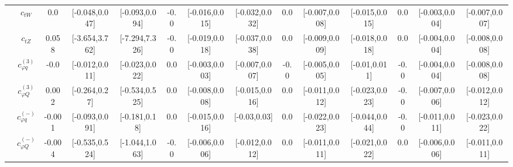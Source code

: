 \documentclass{article}
\begin{document}
\begin{table}[H]
\begin{tabular}{|c|c|c|c|c|c|c|c|c|c|c|c|c|c|}
 & $c_{tW}$ & 0.0                             & [-0.048,0.047]                                 & [-0.093,0.094] & -0.0                             & [-0.016,0.015]                                 & [-0.032,0.032] & 0.0                             & [-0.007,0.008]                                 & [-0.015,0.015] & 0.0                             & [-0.003,0.004]                                 & [-0.007,0.007] \\ \cline{2-14}
 & $c_{tZ}$ & 0.058                             & [-3.654,3.762]                                 & [-7.294,7.326] & -0.0                             & [-0.019,0.018]                                 & [-0.037,0.038] & 0.0                             & [-0.009,0.009]                                 & [-0.018,0.018] & 0.0                             & [-0.004,0.004]                                 & [-0.008,0.008] \\ \cline{2-14}
 & $c_{\varphi q}^{(3)}$ & -0.0                             & [-0.012,0.011]                                 & [-0.023,0.022] & 0.0                             & [-0.003,0.003]                                 & [-0.007,0.007] & -0.0                             & [-0.005,0.005]                                 & [-0.01,0.011] & -0.0                             & [-0.004,0.004]                                 & [-0.008,0.008] \\ \cline{2-14}
 & $c_{\varphi Q}^{(3)}$ & 0.002                             & [-0.264,0.27]                                 & [-0.534,0.525] & 0.0                             & [-0.008,0.008]                                 & [-0.015,0.016] & 0.0                             & [-0.011,0.012]                                 & [-0.023,0.023] & -0.0                             & [-0.007,0.006]                                 & [-0.012,0.012] \\ \cline{2-14}
 & $c_{\varphi q}^{(-)}$ & -0.001                             & [-0.093,0.091]                                 & [-0.181,0.18] & 0.0                             & [-0.015,0.016]                                 & [-0.03,0.03] & 0.0                             & [-0.022,0.023]                                 & [-0.044,0.044] & -0.0                             & [-0.011,0.011]                                 & [-0.023,0.022] \\ \cline{2-14}
 & $c_{\varphi Q}^{(-)}$ & -0.004                             & [-0.535,0.524]                                 & [-1.044,1.063] & -0.0                             & [-0.006,0.006]                                 & [-0.012,0.012] & 0.0                             & [-0.011,0.011]                                 & [-0.021,0.022] & 0.0                             & [-0.006,0.006]                                 & [-0.011,0.011] \\ \cline{2-14}

\end{tabular}
\end{table}
\end{document}
